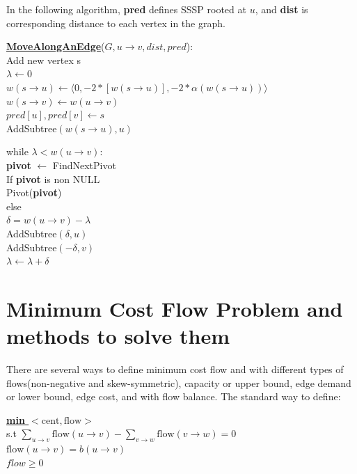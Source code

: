 \documentclass{article}
\begin{document}
In the following algorithm, \textbf{pred} defines SSSP rooted at $u$, and 
\textbf{dist} is corresponding distance to each vertex in the graph.

\begin{algorithm}
\textbf{\underline{MoveAlongAnEdge}}($G, u \rightarrow v, dist, pred$): \\ \quad
Add new vertex s \\ \quad
$\lambda \leftarrow 0$ \\ \quad
$w(s \rightarrow u) \leftarrow \langle 0, -2 * [w(s \rightarrow u)], 
-2 * \alpha(w(s \rightarrow u)) \rangle$ \\ \quad
$w(s \rightarrow v) \leftarrow w(u \rightarrow v)$ \\ \quad
$pred[u], pred[v] \leftarrow s$ \\ \quad
AddSubtree$(w(s \rightarrow u), u)$ \\ \quad

while $\lambda < w(u \rightarrow v)$: \\ \quad \quad
    \textbf{pivot} $\leftarrow $ FindNextPivot \\ \quad \quad
    If \textbf{pivot} is non NULL \\ \qquad \quad
        Pivot(\textbf{pivot}) \\ \quad \quad
    else \\ \qquad \quad
        $\delta = w(u \rightarrow v) - \lambda$ \\ \qquad \quad
        AddSubtree$(\delta, u)$ \\ \qquad \quad
        AddSubtree$(-\delta, v)$ \\ \qquad \quad
        $\lambda \leftarrow \lambda + \delta$ \\
\end{algorithm}

\section{Minimum Cost Flow Problem and methods to solve them}
There are several ways to define minimum cost flow and with different types of 
flows(non-negative and skew-symmetric), capacity or upper bound, edge demand or 
lower bound, edge cost, and with flow balance. The standard way to define:
\begin{center}
\begin{algorithm}
\textbf{\underline{min $< \text{cent}, \text{flow}>$}} \\
  s.t  $\sum \limits_{u \rightarrow v} \text{flow} 
  (u \rightarrow v) - \sum \limits_{v \rightarrow w} \text{flow} (v \rightarrow w)= 0 $  \\ 
  \qquad
       $\text{flow}(u \rightarrow v) = b(u \rightarrow v)$ \\ \qquad
       $flow \geq 0$
\end{algorithm}
\end{center}
\end{document}
